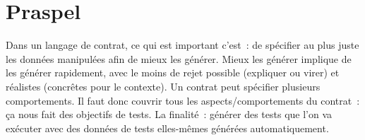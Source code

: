 \section{Praspel}
\label{section:language:praspel}

Dans un langage de contrat, ce qui est important c'est : de spécifier au plus
juste les données manipulées afin de mieux les générer. Mieux les générer
implique de les générer rapidement, avec le moins de rejet possible (expliquer
ou virer) et réalistes (concrêtes pour le contexte). Un contrat peut spécifier
plusieurs comportements. Il faut donc couvrir tous les aspects/comportements du
contrat : ça nous fait des objectifs de tests. La finalité : générer des tests
que l'on va exécuter avec des données de tests elles-mêmes générées
automatiquement.
